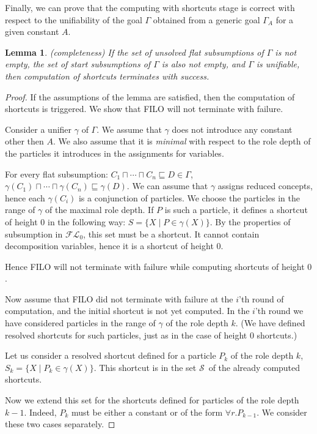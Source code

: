 \documentclass{article}
\newtheorem{lemma}{Lemma}
\newcommand{\flo}{\ensuremath{\mathcal{FL}_0}\xspace}
\renewcommand{\S}{\ensuremath{\mathcal{S}}}
\begin{document}
Finally, we can prove that the computing with shortcuts stage is correct with respect to the unifiability of the goal $\Gamma$ obtained
from a generic goal $\Gamma_A$ for a given constant $A$.

\begin{lemma}(completeness) \label{lemma:shcompleteness}
	If  the set of unsolved flat subsumptions of $\Gamma$ is not empty, the set of start subsumptions of $\Gamma$ is also not empty, and $\Gamma$ is unifiable, then computation of shortcuts terminates with \emph{success}.
\end{lemma}
\begin{proof}
	If the assumptions of the lemma are satisfied, then the computation of shortcuts is triggered.
	We show that FILO will not terminate with failure.
	
	Consider a unifier $\gamma$ of $\Gamma$. We assume that $\gamma$ does not introduce any constant other then $A$. 
	We also assume that it is \emph{minimal} with respect to the role depth of the particles it introduces in the assignments for variables.
	
	For every flat subsumption: $C_1 \sqcap \cdots \sqcap C_n \sqsubseteq D \in \Gamma$,
	$\gamma(C_1) \sqcap \cdots \sqcap \gamma(C_n )\sqsubseteq \gamma(D )$.
	We can assume that $\gamma$ assigns reduced concepts, hence each $\gamma(C_i)$ is a conjunction of particles.
	We choose the particles in the range of $\gamma$ of the maximal role depth.
	If $P$ is such a particle, it defines a shortcut of height $0$ in the following way:
	$S = \{X \mid P \in \gamma(X)\}$. By the properties of subsumption in \flo, this set must be a shortcut.
	It cannot contain decomposition variables, hence it is a shortcut of height $0$.
	
	Hence FILO will not terminate with failure while computing shortcuts of height $0$.
	
	Now assume that FILO did not terminate with failure at the $i$'th round of computation, and
	the initial shortcut is not yet computed. In the $i$'th round we have considered particles in the range of $\gamma$
	of the role depth $k$. (We have defined resolved shortcuts for such particles, just as in the case of height $0$ shortcuts.)
	
	Let us consider a resolved shortcut defined for a particle $P_k$ of the role depth $k$, $S_k = \{X \mid P_k \in \gamma(X)\}$.
	This shortcut is in the set \S\ of the already computed shortcuts.
	
	Now we extend this set for the shortcuts defined for particles of the role depth $k-1$.
	Indeed, $P_k$ must be either a constant or of the form $\forall r.P_{k-1}$. We consider these two cases separately.
	

\end{proof}
\end{document}
